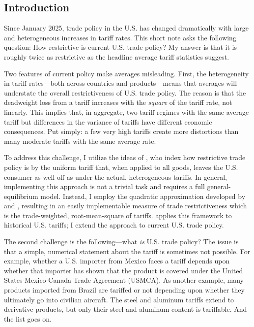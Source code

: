 \documentclass[12pt,pdftex]{article}
\begin{document}
\begin{onehalfspacing}
\hspace{-0.05cm}

\newpage

\subsection*{Introduction}

Since January 2025, trade policy in the U.S. has changed dramatically with large and heterogeneous increases in tariff rates. This short note asks the following question: How restrictive is current U.S. trade policy? My answer is that it is roughly twice as restrictive as the headline average tariff statistics suggest.

Two features of current policy make averages misleading. First, the heterogeneity in tariff rates---both across countries and products---means that averages will understate the overall restrictiveness of U.S. trade policy. The reason is that the deadweight loss from a tariff increases with the \emph{square} of the tariff rate, not linearly. This implies that, in aggregate, two tariff regimes with the same average tariff but differences in the variance of tariffs have different economic consequences. Put simply: a few very high tariffs create more distortions than many moderate tariffs with the same average rate.

To address this challenge, I utilize the ideas of \citet{anderson1996new, anderson2005measuring}, who index how restrictive trade policy is by the uniform tariff that, when applied to all goods, leaves the U.S. consumer as well off as under the actual, heterogeneous tariffs. In general, implementing this approach is not a trivial task and requires a full general-equilibrium model. Instead, I employ the quadratic approximation developed by \citet{feenstra1995estimating} and \citet*{keeNicitaOlarreaga2009}, resulting in an easily implementable measure of trade restrictiveness which is the trade-weighted, root-mean-square of tariffs. \citet{irwin2010trade} applies this framework to historical U.S. tariffs; I extend the approach to current U.S. trade policy.

The second challenge is the following---what \emph{is} U.S. trade policy? The issue is that a simple, numerical statement about the tariff is sometimes not possible. For example, whether a U.S. importer from Mexico faces a tariff depends upon whether that importer has shown that the product is covered under the United States-Mexico-Canada Trade Agreement (USMCA). As another example, many products imported from Brazil are tariffed or not depending upon whether they ultimately go into civilian aircraft. The steel and aluminum tariffs extend to derivative products, but only their steel and aluminum content is tariffable. And the list goes on.


\end{onehalfspacing}
\end{document}
